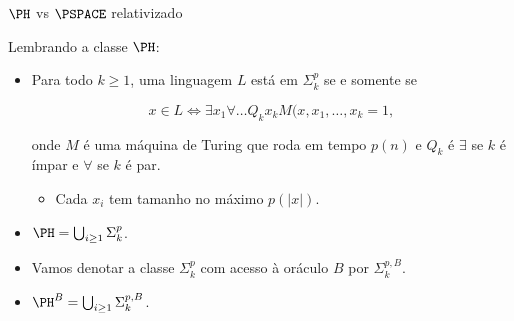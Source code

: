 \documentclass[landscape, 9pt]{beamer}
\begin{document}

\begin{frame} {$\PH$ vs $\PSPACE$ relativizado}

Lembrando a classe $\PH$:

\begin{itemize}

	\item Para todo $k \geq 1$, uma linguagem $L$ está em $\Sigma_{k}^{p}$ se e somente se
	
	\begin{equation*}
		x \in L \iff \exists x_{1} \forall \dots Q_{k} x_{k} M(x, x_{1}, \dots, x_{k} = 1,
	\end{equation*}
	
	onde $M$ é uma máquina de Turing que roda em tempo $p(n)$ e $Q_{k}$ é $\exists$ se $k$ é ímpar e $\forall$ se $k$ é par.
	
	\begin{itemize}
	
		\item Cada $x_{i}$ tem tamanho no máximo $p(\lvert x \rvert)$.
	
	\end{itemize}
	
	\item $\PH = \bigcup_{i \geq 1} \Sigma_{k}^{p}$.
	
	\item Vamos denotar a classe $\Sigma_{k}^{p}$ com acesso à oráculo $B$ por $\Sigma_{k}^{p, B}$.
	
	\item $\PH^{B} = \bigcup_{i \geq 1} \Sigma_{k}^{p, B}$.

\end{itemize}

\end{frame}

\end{document}
